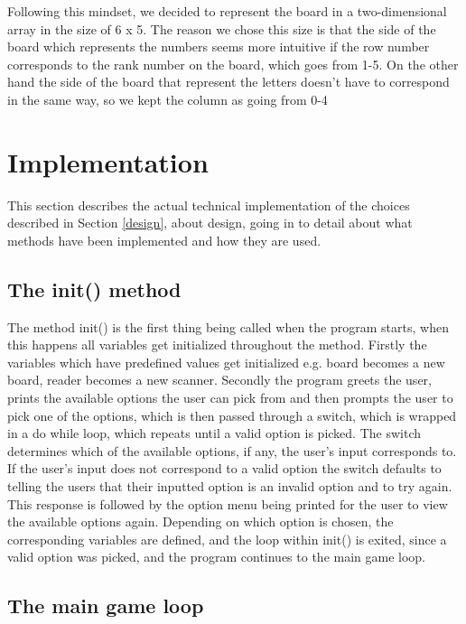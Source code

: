 \documentclass[12pt, a4paper]{article}
\begin{document}
	\vspace{10mm}
		
	Following this mindset, we decided to represent the board in a two-dimensional array in the size of 6 x 5. The reason we chose this size is that the side of the board which represents the numbers seems more intuitive if the row number corresponds to the rank number on the board, which goes from 1-5. On the other hand the side of the board that represent the letters doesn’t have to correspond in the same way, so we kept the column as going from 0-4
	
	\section{Implementation}
	This section describes the actual technical implementation of the choices described in Section \ref{design}, about design, going in to detail about what methods have been implemented and how they are used.
	
	\subsection{The init() method}
	
	The method init() is the first thing being called when the program starts, when this happens all variables get initialized throughout the method. Firstly the variables which have predefined values get initialized e.g. board becomes a new board, reader becomes a new scanner. Secondly the program greets the user, prints the available options the user can pick from and then prompts the user to pick one of the options, which is then passed through a switch, which is wrapped in a do while loop, which repeats until a valid option is picked. The switch determines which of the available options, if any, the user's input corresponds to. If the user’s input does not correspond to a valid option the switch defaults to telling the users that their inputted option is an invalid option and to try again. This response is followed by the option menu being printed for the user to view the available options again. 
	Depending on which option is chosen, the corresponding variables are defined, and the loop within init() is exited, since a valid option was picked, and the program continues to the main game loop.
	
	\subsection{The main game loop}
	
\end{document}
